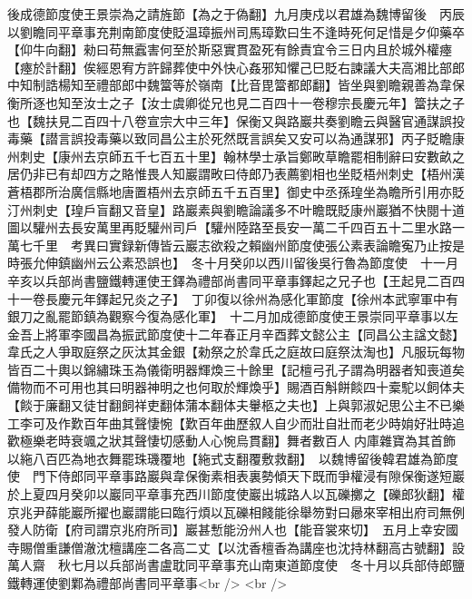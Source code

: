 後成德節度使王景崇為之請旌節【為之于偽翻】九月庚戍以君雄為魏博留後　丙辰以劉瞻同平章事充荆南節度使貶温璋振州司馬璋歎曰生不逢時死何足惜是夕仰藥卒【仰牛向翻】勑曰苟無蠧害何至於斯惡實貫盈死有餘責宜令三日内且於城外權瘞【瘞於計翻】俟經恩宥方許歸葬使中外快心姦邪知懼己巳貶右諫議大夫高湘比部郎中知制誥楊知至禮部郎中魏簹等於嶺南【比音毘簹都郎翻】皆坐與劉瞻親善為韋保衡所逐也知至汝士之子【汝士虞卿從兄也見二百四十一卷穆宗長慶元年】簹扶之子也【魏扶見二百四十八卷宣宗大中三年】保衡又與路巖共奏劉瞻云與醫官通謀誤投毒藥【譛言誤投毒藥以致同昌公主於死然既言誤矣又安可以為通謀邪】丙子貶瞻康州刺史【康州去京師五千七百五十里】翰林學士承旨鄭畋草瞻罷相制辭曰安數畝之居仍非已有却四方之賂惟畏人知巖謂畋曰侍郎乃表薦劉相也坐貶梧州刺史【梧州漢蒼梧郡所治廣信縣地唐置梧州去京師五千五百里】御史中丞孫瑝坐為瞻所引用亦貶汀州刺史【瑝戶盲翻又音皇】路巖素與劉瞻論議多不叶瞻既貶康州巖猶不快閱十道圖以驩州去長安萬里再貶驩州司戶【驩州陸路至長安一萬二千四百五十二里水路一萬七千里　考異曰實録新傳皆云巖志欲殺之賴幽州節度使張公素表論瞻寃乃止按是時張允伸鎮幽州云公素恐誤也】　冬十月癸卯以西川留後吳行魯為節度使　十一月辛亥以兵部尚書鹽鐵轉運使王鐸為禮部尚書同平章事鐸起之兄子也【王起見二百四十一卷長慶元年鐸起兄炎之子】　丁卯復以徐州為感化軍節度【徐州本武寧軍中有銀刀之亂罷節鎮為觀察今復為感化軍】　十二月加成德節度使王景崇同平章事以左金吾上將軍李國昌為振武節度使十二年春正月辛酉葬文懿公主【同昌公主諡文懿】韋氏之人爭取庭祭之灰汰其金銀【勑祭之於韋氏之庭故曰庭祭汰淘也】凡服玩每物皆百二十輿以錦繡珠玉為儀衛明器輝煥三十餘里【記檀弓孔子謂為明器者知喪道矣備物而不可用也其曰明器神明之也何取於輝煥乎】賜酒百斛餅餤四十槖駝以飼体夫【餤于廉翻又徒甘翻飼祥吏翻体蒲本翻体夫轝柩之夫也】上與郭淑妃思公主不已樂工李可及作歎百年曲其聲悽惋【歎百年曲歷叙人自少而壯自壯而老少時姢好壯時追歡極樂老時衰颯之狀其聲悽切感動人心惋烏貫翻】舞者數百人内庫雜寶為其首飾以絁八百匹為地衣舞罷珠璣覆地【絁式支翻覆敷救翻】　以魏博留後韓君雄為節度使　門下侍郎同平章事路巖與韋保衡素相表裏勢傾天下既而爭權浸有隙保衡遂短巖於上夏四月癸卯以巖同平章事充西川節度使巖出城路人以瓦礫擲之【礫郎狄翻】權京兆尹薛能巖所擢也巖謂能曰臨行煩以瓦礫相餞能徐舉笏對曰曏來宰相出府司無例發人防衛【府司謂京兆府所司】巖甚慙能汾州人也【能音裳來切】　五月上幸安國寺賜僧重謙僧澈沈檀講座二各高二丈【以沈香檀香為講座也沈持林翻高古號翻】設萬人齋　秋七月以兵部尚書盧耽同平章事充山南東道節度使　冬十月以兵部侍郎鹽鐵轉運使劉鄴為禮部尚書同平章事<br />
<br />

